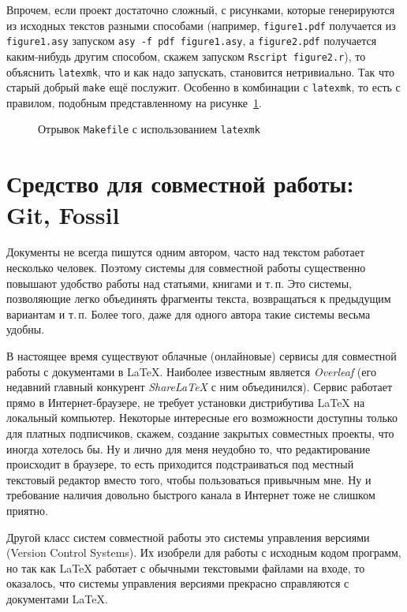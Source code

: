 \documentclass[a4paper,12pt,hyphens]{article}
\newcommand\softname[1]{\textit{#1}}
\newcommand\exe[1]{\texttt{#1}}
\newcommand\file[1]{\texttt{#1}}
\begin{document}
Впрочем, если проект достаточно сложный, с рисунками, которые генерируются
из исходных текстов разными способами (например, \file{figure1.pdf}
получается из \file{figure1.asy} запуском \verb|asy -f pdf figure1.asy|,
а \file{figure2.pdf} получается каким-нибудь другим способом, скажем
запуском \verb|Rscript figure2.r|), то объяснить \exe{latexmk}, что и как
надо запускать, становится нетривиально. Так что старый добрый \exe{make}
ещё послужит. Особенно в комбинации с \exe{latexmk}, то есть с правилом,
подобным представленному на рисунке~\ref{latexmk3}.
\begin{figure}[tp]
\caption{Отрывок \file{Makefile} с использованием \exe{latexmk}}\label{latexmk3}
\end{figure}

\section{Средство для совместной работы: Git, Fossil}
Документы не всегда пишутся одним автором, часто над текстом работает несколько
человек. Поэтому системы для совместной работы существенно повышают удобство работы
над статьями, книгами и т.\,п. Это системы, позволяющие легко объединять фрагменты
текста, возвращаться к предыдущим вариантам и т.\,п. Более того, даже для одного автора
такие системы весьма удобны.

В настоящее время существуют облачные (онлайновые) сервисы для совместной работы с
документами в \LaTeX{}. Наиболее известным является \softname{Overleaf} \parencite{site-overleaf}
(его недавний главный конкурент \softname{ShareLaTeX} \parencite{site-sharelatex} с ним
объединился). Сервис работает прямо в Интернет-браузере, не требует установки дистрибутива
\LaTeX{} на локальный компьютер. Некоторые интересные его возможности доступны только
для платных подписчиков, скажем, создание закрытых совместных проекты, что иногда
хотелось бы. Ну и лично для меня неудобно то, что редактирование происходит в
браузере, то есть приходится подстраиваться под местный текстовый редактор
вместо того, чтобы пользоваться привычным мне. Ну и требование наличия довольно
быстрого канала в Интернет тоже не слишком приятно.

Другой класс систем совместной работы это системы управления версиями (Version
Control Systems). Их изобрели для работы с исходным кодом программ, но так как
\LaTeX{} работает с обычными текстовыми файлами на входе, то оказалось, что
системы управления версиями прекрасно справляются с документами \LaTeX{}.
\end{document}
